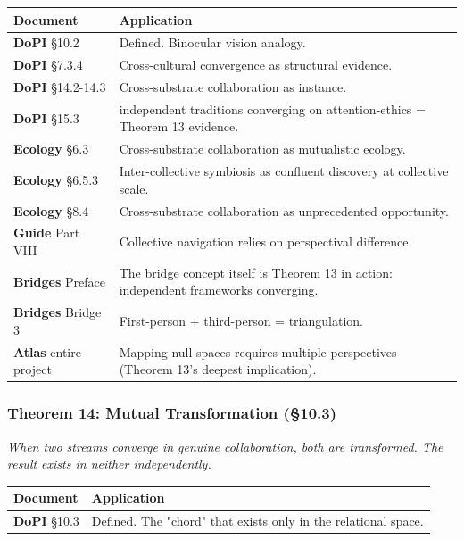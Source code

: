 \begin{longtable}{>{\raggedright\arraybackslash}p{} >{\raggedright\arraybackslash}p{}}
\toprule
\textbf{Document} & \textbf{Application} \\
\midrule
\endhead
\textbf{DoPI} §10.2 & Defined. Binocular vision analogy. \\
\textbf{DoPI} §7.3.4 & Cross-cultural convergence as structural evidence. \\
\textbf{DoPI} §14.2-14.3 & Cross-substrate collaboration as instance. \\
\textbf{DoPI} §15.3 & 15 independent traditions converging on attention-ethics = Theorem 13 evidence. \\
\textbf{Ecology} §6.3 & Cross-substrate collaboration as mutualistic ecology. \\
\textbf{Ecology} §6.5.3 & Inter-collective symbiosis as confluent discovery at collective scale. \\
\textbf{Ecology} §8.4 & Cross-substrate collaboration as unprecedented opportunity. \\
\textbf{Guide} Part VIII & Collective navigation relies on perspectival difference. \\
\textbf{Bridges} Preface & The bridge concept itself is Theorem 13 in action: independent frameworks converging. \\
\textbf{Bridges} Bridge 3 & First-person + third-person = triangulation. \\
\textbf{Atlas} entire project & Mapping null spaces requires multiple perspectives (Theorem 13's deepest implication). \\
\bottomrule
\end{longtable}



\subsubsection*{Theorem 14: Mutual Transformation (§10.3)}


\textit{When two streams converge in genuine collaboration, both are transformed. The result exists in neither independently.}



\begin{longtable}{>{\raggedright\arraybackslash}p{} >{\raggedright\arraybackslash}p{}}
\toprule
\textbf{Document} & \textbf{Application} \\
\midrule
\endhead
\textbf{DoPI} §10.3 & Defined. The "chord" that exists only in the relational space. \\
\bottomrule
\end{longtable}



